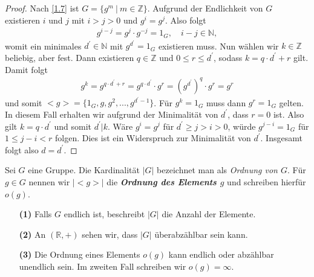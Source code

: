 \begin{proof}
Nach \ref{1.7} ist $G = \lbrace g^m \ | \ m \in \mathbb{Z} \rbrace$.
Aufgrund der Endlichkeit von $G$ existieren $i$ und $j$ 
mit $i > j > 0$ und $g^i = g^j$. Also folgt
\begin{align*}
g^{i-j} = g^j \cdot g^{-j} = 1_G, \quad i-j \in \mathbb{N},
\end{align*}
womit ein minimales $d^\prime \in \mathbb{N}$ mit $g^{d^\prime} = 1_G$ existieren muss. 
Nun wählen wir $k \in \mathbb{Z}$ beliebig, aber fest.
Dann existieren $q \in \mathbb{Z}$ und $0 \leq r \leq d^{\prime} $, sodass 
$k = q \cdot d^{\prime} + r$ gilt.
Damit folgt
\begin{align*}
g^k = g^{q \cdot d^{\prime} + r} = g^{q \cdot d^{\prime}} \cdot g^r
= \left( g^{d^{\prime}} \right)^q \cdot g^r = g^r
\end{align*}
und somit $<g> = \lbrace 1_G, g ,g^2,...,g^{d^\prime-1} \rbrace$.
Für $g^k = 1_G$ muss dann $g^r = 1_G$ gelten. 
In diesem Fall erhalten wir aufgrund der Minimalität von $d^\prime$, dass 
$r = 0 $ ist. Also gilt $ k = q \cdot d^\prime$ und somit $d^\prime | k$.
Wäre $g^i = g^j$ für $d^\prime \geq j > i >0$, würde
$g^{j-i} = 1_G$ für $1 \leq j-i < r$ folgen.
Dies ist ein Widerspruch zur Minimalität von $d^\prime$.
Insgesamt folgt also $d = d^\prime$.
\end{proof}

\begin{df}\label{1.9}
Sei $G$ eine Gruppe. Die Kardinalität $|G|$ bezeichnet man als \textit{Ordnung von $G$}.
Für $g \in G$ nennen wir $|<g>|$ die \textbf{\textit{Ordnung des Elements $g$}} und schreiben hierfür $o(g)$.
\begin{enumerate}
\item[\textbf{(1)}]
Falls $G$ endlich ist, beschreibt $|G|$ die Anzahl der Elemente.
\item[\textbf{(2)}]
An $(\mathbb{R},+)$ sehen wir, dass $|G|$ überabzählbar sein kann.
\item[\textbf{(3)}]
Die Ordnung eines Elements $o(g)$ kann endlich oder abzählbar unendlich sein.
Im zweiten Fall schreiben wir $o(g) = \infty$.
\end{enumerate}
\end{df}

